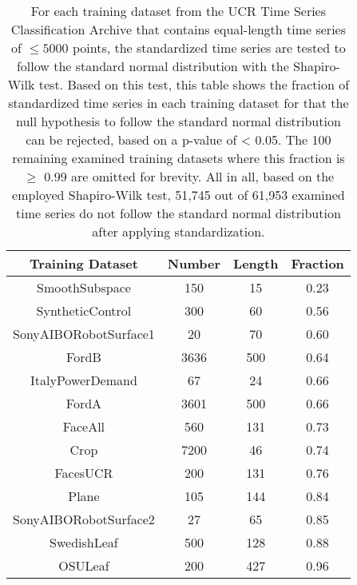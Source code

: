 \begin{table}[htb]
\centering
\begin{tabular}{cccc} 
\toprule
\textbf{Training Dataset} & \textbf{Number} & \textbf{Length} & \textbf{Fraction} \\
\midrule
SmoothSubspace & 150 & 15 & 0.23 \\
SyntheticControl & 300 & 60 & 0.56 \\
SonyAIBORobotSurface1 & 20 & 70 & 0.60 \\
FordB & 3636 & 500 & 0.64 \\
ItalyPowerDemand & 67 & 24 & 0.66 \\
FordA & 3601 & 500 & 0.66 \\ 
FaceAll & 560 & 131 & 0.73 \\
Crop & 7200 & 46 & 0.74 \\
FacesUCR & 200 & 131 & 0.76 \\
Plane & 105 & 144 & 0.84 \\
SonyAIBORobotSurface2 & 27 & 65 & 0.85 \\
SwedishLeaf & 500 & 128 & 0.88 \\
OSULeaf & 200 & 427 & 0.96 \\
\bottomrule
\end{tabular}
\vspace*{0.5cm}
\caption[UCR Time Series - Testing for Standard Normal Distribution]{For each training dataset from the UCR Time Series Classification Archive \cite{UCR_Archive} that contains equal-length time series of $\leq 5000$ points, the standardized time series are tested to follow the standard normal distribution with the Shapiro-Wilk test. Based on this test, this table shows the fraction of standardized time series in each training dataset for that the null hypothesis to follow the standard normal distribution can be rejected, based on a p-value of < 0.05. The 100 remaining examined training datasets where this fraction is $\geq$ 0.99 are omitted for brevity. All in all, based on the employed Shapiro-Wilk test, 51,745 out of 61,953 examined time series do not follow the standard normal distribution after applying standardization.}
\label{tab:shapiro_UCR}
\end{table}
